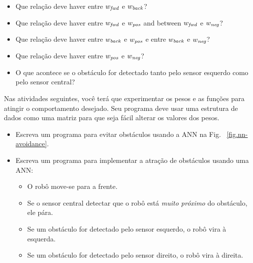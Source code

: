 \begin{framed}
\begin{itemize}
\item Que relação deve haver entre $w_{\textit{\scriptsize fwd}}$ e $w_{\textit{\scriptsize back}}$?
\item Que relação deve haver entre $w_{\textit{\scriptsize fwd}}$ e $w_{\textit{\scriptsize pos}}$ and between $w_{\textit{\scriptsize fwd}}$ e $w_{\textit{\scriptsize neg}}$?
\item Que relação deve haver entre $w_{\textit{\scriptsize back}}$ e $w_{\textit{\scriptsize pos}}$ e entre $w_{\textit{\scriptsize back}}$ e  $w_{\textit{\scriptsize neg}}$?
\item Que relação deve haver entre $w_{\textit{\scriptsize pos}}$ e $w_{\textit{\scriptsize neg}}$?
\item O que acontece se o obstáculo for detectado tanto pelo sensor esquerdo como pelo sensor central?
\end{itemize}
\end{framed}

Nas atividades seguintes, você terá que experimentar os pesos e as funções para atingir o comportamento desejado. Seu programa deve usar uma estrutura de dados como uma matriz para que seja fácil alterar os valores dos pesos.

\begin{framed}
\begin{itemize}
\item Escreva um programa para evitar obstáculos usando a ANN na Fig.~ \ref{fig.nn-avoidance}.
\end{itemize}
\end{framed}

\begin{framed}
\begin{itemize}
\item Escreva um programa para implementar a atração de obstáculos usando uma ANN:
\begin{itemize}
\item O robô move-se para a frente.
\item Se o sensor central detectar que o robô está \emph{muito próximo} do obstáculo, ele pára.
\item Se um obstáculo for detectado pelo sensor esquerdo, o robô vira à esquerda.
\item Se um obstáculo for detectado pelo sensor direito, o robô vira à direita.
\end{itemize}
\end{itemize}
\end{framed}

